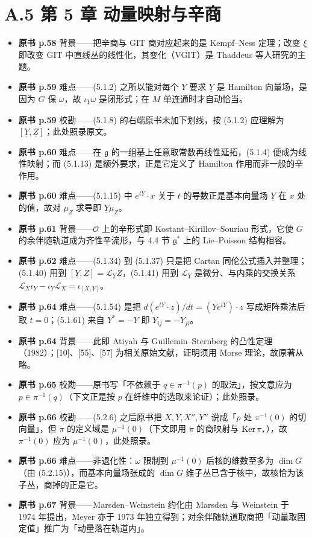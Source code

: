 \section*{A.5 第 5 章 动量映射与辛商}
\begin{itemize}[leftmargin=2.4em,itemsep=4pt,label={\textbullet}]
\item \textbf{原书 p.58} 背景——把辛商与 GIT 商对应起来的是 Kempf--Ness 定理；改变 $\xi$ 即改变 GIT 中直线丛的线性化，其变化（VGIT）是 Thaddeus 等人研究的主题。
\item \textbf{原书 p.59} 难点——(5.1.2) 之所以能对每个 $Y$ 要求 $\underline{Y}$ 是 Hamilton 向量场，是因为 $G$ 保 $\omega$，故 $\iota_{\underline{Y}}\omega$ 是闭形式；在 $M$ 单连通时才自动恰当。
\item \textbf{原书 p.59} 校勘——(5.1.8) 的右端原书未加下划线，按 (5.1.2) 应理解为 $[\underline{Y},\underline{Z}]$；此处照录原文。
\item \textbf{原书 p.60} 难点——在 $\mathfrak{g}$ 的一组基上任意取常数再线性延拓，(5.1.4) 便成为线性映射；而 (5.1.13) 是额外要求，正是它定义了 Hamilton 作用而非一般的辛作用。
\item \textbf{原书 p.60} 难点——(5.1.15) 中 $e^{tY}\cdot x$ 关于 $t$ 的导数正是基本向量场 $\underline{Y}$ 在 $x$ 处的值，故对 $\mu_Z$ 求导即 $\underline{Y}\mu_Z$。
\item \textbf{原书 p.61} 背景——$\mathcal{O}$ 上的辛形式即 Kostant--Kirillov--Souriau 形式，它使 $G$ 的余伴随轨道成为齐性辛流形，与 4.4 节 $\mathfrak{g}^*$ 上的 Lie--Poisson 结构相容。
\item \textbf{原书 p.62} 难点——(5.1.34) 到 (5.1.37) 只是把 Cartan 同伦公式插入并整理；(5.1.40) 用到 $[\underline{Y},\underline{Z}]=\mathcal{L}_{\underline{Y}}\underline{Z}$，(5.1.41) 用到 $\mathcal{L}_{\underline{Y}}$ 是微分、与内乘的交换关系 $\mathcal{L}_{X}\iota_Y-\iota_Y\mathcal{L}_X=\iota_{[X,Y]}$。
\item \textbf{原书 p.64} 难点——(5.1.54) 是把 $d(e^{tY}\cdot z)/dt=(Ye^{tY})\cdot z$ 写成矩阵乘法后取 $t=0$；(5.1.61) 来自 $Y^*=-Y$ 即 $\overline{Y_{ij}}=-Y_{ji}$。
\item \textbf{原书 p.64} 背景——此即 Atiyah 与 Guillemin--Sternberg 的凸性定理（1982）；[10]、[55]、[57] 为相关原始文献，证明须用 Morse 理论，故原著从略。
\item \textbf{原书 p.65} 校勘——原书写「不依赖于 $q\in\pi^{-1}(p)$ 的取法」，按文意应为 $p\in\pi^{-1}(q)$（下文正是按 $p$ 在纤维中的选取来论证）；此处照录。
\item \textbf{原书 p.66} 校勘——(5.2.6) 之后原书把 $X,Y,X'',Y''$ 说成「$p$ 处 $\pi^{-1}(0)$ 的切向量」，但 $\pi$ 的定义域是 $\mu^{-1}(0)$（下文即用 $\pi$ 的商映射与 $\operatorname{Ker}\pi_*$），故 $\pi^{-1}(0)$ 应为 $\mu^{-1}(0)$，此处照录。
\item \textbf{原书 p.66} 难点——非退化性：$\omega$ 限制到 $\mu^{-1}(0)$ 后核的维数至多为 $\dim G$（由 (5.2.15)），而基本向量场张成的 $\dim G$ 维子丛已含于核中，故核恰为该子丛，商掉的正是它。
\item \textbf{原书 p.67} 背景——Marsden--Weinstein 约化由 Marsden 与 Weinstein 于 1974 年提出，Meyer 亦于 1973 年独立得到；对余伴随轨道取商把「动量取固定值」推广为「动量落在轨道内」。
\end{itemize}

